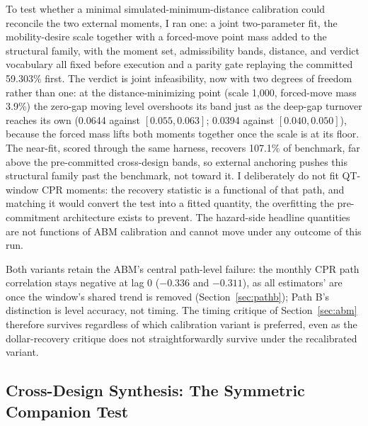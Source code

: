 \documentclass[12pt]{article}
\begin{document}
To test whether a minimal simulated-minimum-distance calibration could reconcile the two external moments, I ran one: a joint two-parameter fit, the mobility-desire scale together with a forced-move point mass added to the structural family, with the moment set, admissibility bands, distance, and verdict vocabulary all fixed before execution and a parity gate replaying the committed 59.303\% first. The verdict is joint infeasibility, now with two degrees of freedom rather than one: at the distance-minimizing point (scale 1{,}000, forced-move mass 3.9\%) the zero-gap moving level overshoots its band just as the deep-gap turnover reaches its own (0.0644 against $[0.055, 0.063]$; 0.0394 against $[0.040, 0.050]$), because the forced mass lifts both moments together once the scale is at its floor. The near-fit, scored through the same harness, recovers 107.1\% of benchmark, far above the pre-committed cross-design bands, so external anchoring pushes this structural family past the benchmark, not toward it. I deliberately do not fit QT-window CPR moments: the recovery statistic is a functional of that path, and matching it would convert the test into a fitted quantity, the overfitting the pre-commitment architecture exists to prevent. The hazard-side headline quantities are not functions of ABM calibration and cannot move under any outcome of this run.

Both variants retain the ABM's central path-level failure: the monthly CPR path correlation stays negative at lag 0 ($-0.336$ and $-0.311$), as all estimators' are once the window's shared trend is removed (Section~\ref{sec:pathb}); Path B's distinction is level accuracy, not timing. The timing critique of Section~\ref{sec:abm} therefore survives regardless of which calibration variant is preferred, even as the dollar-recovery critique does not straightforwardly survive under the recalibrated variant.

\subsection{Cross-Design Synthesis: The Symmetric Companion Test}\label{sec:robustness-synthesis}
\end{document}
